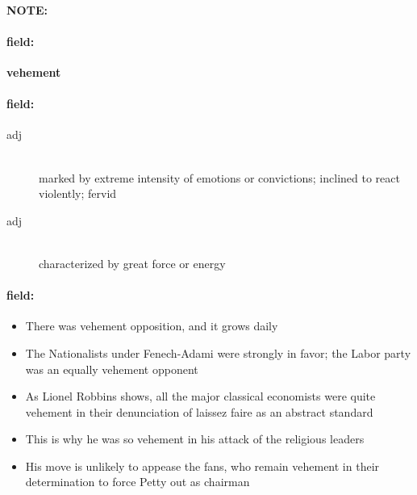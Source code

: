 \documentclass[12pt]{article}
\newenvironment{note}{\paragraph{NOTE:}}{}
\newenvironment{field}{\paragraph{field:}}{}
\begin{document}
\begin{note}
\begin{field}
\textbf{\large vehement}
\end{field}


\begin{field}
\begin{description}
\item[adj] \hfill \\ 
marked by extreme intensity of emotions or convictions; inclined to react violently; fervid

\item[adj] \hfill \\ 
characterized by great force or energy

\end{description}
\end{field}

\begin{field}
\begin{itemize}
\item There was vehement opposition, and it grows daily
\item The Nationalists under Fenech-Adami were strongly in favor; the Labor party was an equally vehement opponent
\item As Lionel Robbins shows, all the major classical economists were quite vehement in their denunciation of laissez faire as an abstract standard
\item This is why he was so vehement in his attack of the religious leaders
\item His move is unlikely to appease the fans, who remain vehement in their determination to force Petty out as chairman
\end{itemize}
\end{field}
\end{note}
\end{document}
